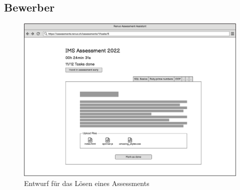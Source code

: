\subsection{Bewerber}
\begin{figure}[H]
    \centering
    \includegraphics[width=12cm]{images/mockups/candidate-solve-assessment.png}
    \caption{\label{fig:mockup-candidate-solve-assessment}Entwurf für das Lösen eines Assessments}
\end{figure}

